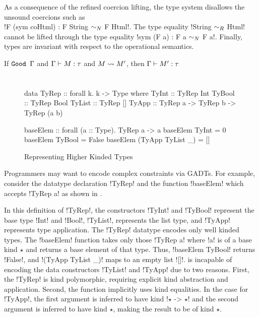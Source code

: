 \documentclass[screen,nonacm,manuscript,review]{acmart} %
\begin{document}
As a consequence of the refined coercion lifting,
the type system disallows the unsound coercions such as\\
!F (sym coHtml) : F String $\mathrel{\sim_N}$ F Html!.
The type equality !String $\mathrel{\sim_R}$ Html! cannot be lifted through the type equality
!sym (F a) : F a $\mathrel{\sim_N}$ F a!. Finally, types are invariant with respect to the operational
semantics.

\begin{lemma}\label{lem:sfr-preservation}
If $\texttt{Good~}\Gamma$ and $\Gamma \vdash M : \tau$ and $M \rightsquigarrow M'$, then $\Gamma \vdash M' : \tau$
\end{lemma}


\section{\SFK}\label{sec:sfk} %
\begin{figure}[h]
\begin{minipage}[ht]{0.5\linewidth}
\begin{code}
data TyRep :: forall k. k -> Type where
   TyInt  :: TyRep Int
   TyBool :: TyRep Bool
   TyList :: TyRep []
   TyApp  :: TyRep a -> TyRep b -> TyRep (a b)
\end{code}
\end{minipage}%
\begin{minipage}[ht]{0.6\linewidth}
\begin{code}
baseElem :: forall (a :: Type). TyRep a -> a
baseElem TyInt = 0
baseElem TyBool = False
baseElem (TyApp TyList _) = []
\end{code}
\end{minipage}
\caption{Representing Higher Kinded Types}
\label{fig:sfk-example}
\end{figure}
Programmers may want to encode complex constraints via GADTs. For example,
consider the datatype declaration !TyRep! and the function !baseElem!
which accepts !TyRep a! as shown in .

In this definition of !TyRep!, the constructors !TyInt! and !TyBool! represent the base type !Int!
and !Bool!, !TyList!, represents the list type,
and !TyApp! represents type application. The !TyRep! datatype encodes only well kinded
types. The !baseElem! function takes only those !TyRep a! where !a! is of a base kind $\star$ and returns
a base element of that type. Thus, !baseElem TyBool! returns !False!,
and !(TyApp TyList _)! maps to an empty list ![]!. \SFC is incapable of encoding
the data constructors !TyList! and !TyApp! due to two reasons.
First, the !TyRep! is kind polymorphic, requiring explicit kind abstraction and
application. Second, the function implicitly uses kind equalities. In the case for !TyApp!,
the first argument is inferred to have kind !$\star$ -> $\star$! and the second argument
is inferred to have kind $\star$, making the result to be of kind $\star$.
\end{document}

